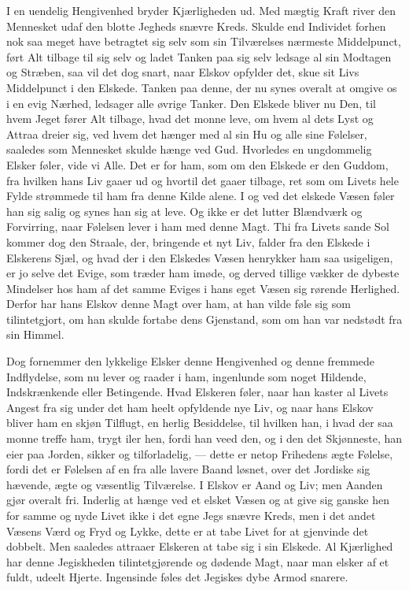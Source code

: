 \documentclass[12pt,a4paper]{book}
\newcommand{\apage}[1]{\marginnote{\footnotesize\textit{[#1]}}}
\begin{document}
I en uendelig Hengivenhed bryder Kjærligheden ud. Med mægtig Kraft
river den Mennesket udaf den blotte Jegheds snævre Kreds. Skulde end
Individet forhen nok saa meget have betragtet sig selv som sin
Tilværelses nærmeste Middelpunct, ført Alt tilbage til sig selv og
ladet Tanken paa sig selv ledsage al sin Modtagen og Stræben, saa vil
det dog snart, naar Elskov opfylder det, skue sit Livs Middelpunct i
den Elskede. Tanken paa denne, der nu synes overalt at omgive os i en
evig Nærhed, ledsager alle øvrige Tanker. Den Elskede bliver nu Den,
til hvem Jeget fører Alt tilbage, hvad det monne leve, om hvem al dets
Lyst og Attraa dreier sig, ved hvem det hænger med al sin Hu og alle
sine Følelser, saaledes som Mennesket skulde hænge ved Gud. Hvorledes
en ungdommelig Elsker føler, vide vi Alle. Det er for ham, som om den
Elskede er den Guddom, fra hvilken hans Liv gaaer ud og hvortil det
gaaer tilbage, ret som om Livets hele Fylde strømmede \apage{20} til ham fra denne
Kilde alene. I og ved det elskede Væsen føler han sig salig og synes
han sig at leve. Og ikke er det lutter Blændværk og Forvirring, naar
Følelsen lever i ham med denne Magt. Thi fra Livets sande Sol kommer
dog den Straale, der, bringende et nyt Liv, falder fra den Elskede i
Elskerens Sjæl, og hvad der i den Elskedes Væsen henrykker ham saa
usigeligen, er jo selve det Evige, som træder ham imøde, og derved
tillige vækker de dybeste Mindelser hos ham af det samme Eviges i hans
eget Væsen sig rørende Herlighed. Derfor har hans Elskov denne Magt
over ham, at han vilde føle sig som tilintetgjort, om han skulde
fortabe dens Gjenstand, som om han var nedstødt fra sin Himmel.

Dog fornemmer den lykkelige Elsker denne Hengivenhed og denne fremmede
Indflydelse, som nu lever og raader i ham, ingenlunde som noget
Hildende, Indskrænkende eller Betingende. Hvad Elskeren føler, naar han
kaster al Livets Angest fra sig under det ham heelt opfyldende nye Liv,
og naar hans Elskov bliver ham en skjøn Tilflugt, en herlig Besiddelse,
til hvilken han, i hvad der saa monne treffe ham, trygt iler hen, fordi
han veed den, og i den det Skjønneste, han eier paa Jorden, sikker og
tilforladelig, --- dette er netop Frihedens ægte Følelse, fordi det er
Følelsen af en fra alle lavere Baand løsnet, over det Jordiske sig
hævende, ægte og væsentlig Tilværelse. I Elskov er Aand og Liv; men
Aanden gjør overalt fri. Inderlig at hænge ved \apage{21} et elsket Væsen og at
give sig ganske hen for samme og nyde Livet ikke i det egne Jegs snævre
Kreds, men i det andet Væsens Værd og Fryd og Lykke, dette er at tabe
Livet for at gjenvinde det dobbelt. Men saaledes attraaer Elskeren at
tabe sig i sin Elskede. Al Kjærlighed har denne Jegiskheden
tilintetgjørende og dødende Magt, naar man elsker af et fuldt, udeelt
Hjerte. Ingensinde føles det Jegiskes dybe Armod snarere.
\end{document}
